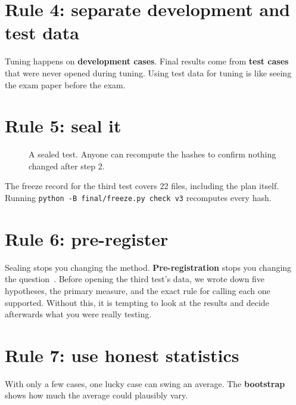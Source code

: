 \section{Rule 4: separate development and test data}
Tuning happens on \textbf{development cases}. Final results come from \textbf{test cases} that were never opened during tuning. Using test data for tuning is like seeing the exam paper before the exam.

\section{Rule 5: seal it}
\begin{figure}[H]
\centering
{}
\caption{A sealed test. Anyone can recompute the hashes to confirm nothing changed after step 2.}
\end{figure}

The freeze record for the third test covers 22 files, including the plan itself. Running \texttt{python -B final/freeze.py check v3} recomputes every hash.

\section{Rule 6: pre-register}
Sealing stops you changing the method. \textbf{Pre-registration} stops you changing the question~\cite{prereg}. Before opening the third test's data, we wrote down five hypotheses, the primary measure, and the exact rule for calling each one supported. Without this, it is tempting to look at the results and decide afterwards what you were really testing.

\section{Rule 7: use honest statistics}
With only a few cases, one lucky case can swing an average. The \textbf{bootstrap}~\cite{bootstrap} shows how much the average could plausibly vary.

